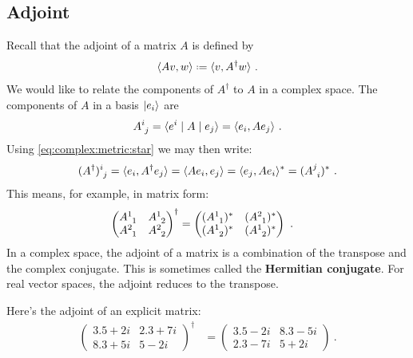 \documentclass[12pt, oneside]{report}    %
\begin{document}
\subsection{Adjoint}


Recall that the adjoint of a matrix $A$ is defined by
\begin{align}
    \la A v , w \ra \defeq 
    \la v, A^\dag w \ra \ .
\end{align}
We would like to relate the components of $A^\dag$ to $A$ in a complex space. The components of $A$ in a basis $\left|e_i\right\rangle$ are 
\begin{align}
    A\aij{i}{j} = \la e^i \mid A \mid e_j \ra 
    = \la e_i, A e_j \ra \ .
\end{align}
Using \eqref{eq:complex:metric:star} we may then write:
\begin{align}
    (A^\dag)\aij{i}{j}
    = 
    \la e_i, A^\dag e_j \ra
    =
    \la A e_i, e_j \ra
    =
    \la e_j, A e_i \ra^*
    =
    (A\aij{j}{i})^* \ .
\end{align}
This means, for example, in matrix form:
\begin{align}
    \begin{pmatrix}
        A\aij 11 & A\aij 12 \\
        A\aij 21 & A\aij 22 
    \end{pmatrix}^\dag &= 
    \begin{pmatrix}
        (A\aij 11)^* & (A\aij 21)^* \\
        (A\aij 12)^* & (A\aij 12 )^*
    \end{pmatrix} \ .
\end{align}
In a complex space, the adjoint of a matrix is a combination of the transpose and the complex conjugate. This is sometimes called the \textbf{Hermitian conjugate}. For real vector spaces, the adjoint reduces to the transpose. 


\begin{example}
Here's the adjoint of an explicit matrix:
\begin{align}
\begin{pmatrix}
        3.5 +2i & 2.3+7i \\
        8.3 + 5i & 5-2i
    \end{pmatrix}^\dag &= 
    \begin{pmatrix}
        3.5 -2i &  8.3 - 5i\\
        2.3 -7i & 5 +2i
    \end{pmatrix} \ .
\end{align}
\end{example}
\end{document}
